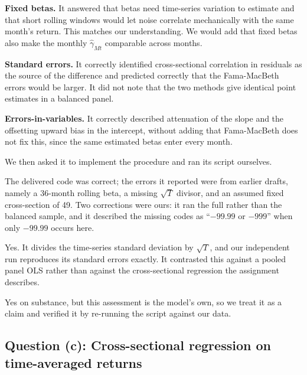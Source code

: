 \begin{tight}
\item \textbf{Fixed betas.} It answered that betas need time-series variation
to estimate and that short rolling windows would let noise correlate
mechanically with the same month's return. This matches our understanding. We
would add that fixed betas also make the monthly $\hat\gamma_{Mt}$ comparable
across months.
\item \textbf{Standard errors.} It correctly identified cross-sectional
correlation in residuals as the source of the difference and predicted
correctly that the Fama-MacBeth errors would be larger. It did not note that
the two methods give identical point estimates in a balanced panel.
\item \textbf{Errors-in-variables.} It correctly described attenuation of the
slope and the offsetting upward bias in the intercept, without adding that
Fama-MacBeth does not fix this, since the same estimated betas enter every
month.
\end{tight}

We then asked it to implement the procedure and ran its script ourselves.

\begin{tight}
\item[(i)] The delivered code was correct; the errors it reported were from
earlier drafts, namely a 36-month rolling beta, a missing $\sqrt{T}$ divisor,
and an assumed fixed cross-section of 49. Two corrections were ours: it ran the
full rather than the balanced sample, and it described the missing codes as
``$-99.99$ or $-999$'' when only $-99.99$ occurs here.
\item[(ii)] Yes. It divides the time-series standard deviation by $\sqrt{T}$,
and our independent run reproduces its standard errors exactly. It contrasted
this against a pooled panel OLS rather than against the cross-sectional
regression the assignment describes.
\item[(iii)] Yes on substance, but this assessment is the model's own, so we
treat it as a claim and verified it by re-running the script against our data.
\end{tight}

\subsection{Question (c): Cross-sectional regression on time-averaged returns}

